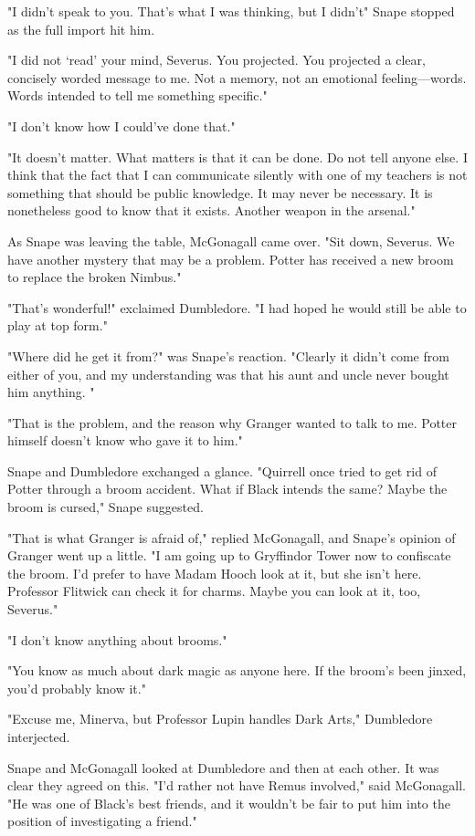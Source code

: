 "I didn't speak to you. That's what I was thinking, but I didn't{\el}" Snape stopped as the full import hit him.

"I did not `read' your mind, Severus. You projected. You projected a clear, concisely worded message to me. Not a memory, not an emotional feeling—words. Words intended to tell me something specific."

"I don't know how I could've done that."

"It doesn't matter. What matters is that it can be done. Do not tell anyone else. I think that the fact that I can communicate silently with one of my teachers is not something that should be public knowledge. It may never be necessary. It is nonetheless good to know that it exists. Another weapon in the arsenal."

As Snape was leaving the table, McGonagall came over. "Sit down, Severus. We have another mystery that may be a problem. Potter has received a new broom to replace the broken Nimbus."

"That's wonderful!" exclaimed Dumbledore. "I had hoped he would still be able to play at top form."

"Where did he get it from?" was Snape's reaction. "Clearly it didn't come from either of you, and my understanding was that his aunt and uncle never bought him anything. "

"That is the problem, and the reason why Granger wanted to talk to me. Potter himself doesn't know who gave it to him."

Snape and Dumbledore exchanged a glance. "Quirrell once tried to get rid of Potter through a broom accident. What if Black intends the same? Maybe the broom is cursed," Snape suggested.

"That is what Granger is afraid of," replied McGonagall, and Snape's opinion of Granger went up a little. "I am going up to Gryffindor Tower now to confiscate the broom. I'd prefer to have Madam Hooch look at it, but she isn't here. Professor Flitwick can check it for charms. Maybe you can look at it, too, Severus."

"I don't know anything about brooms."

"You know as much about dark magic as anyone here. If the broom's been jinxed, you'd probably know it."

"Excuse me, Minerva, but Professor Lupin handles Dark Arts," Dumbledore interjected.

Snape and McGonagall looked at Dumbledore and then at each other. It was clear they agreed on this. "I'd rather not have Remus involved," said McGonagall. "He was one of Black's best friends, and it wouldn't be fair to put him into the position of investigating a friend."

